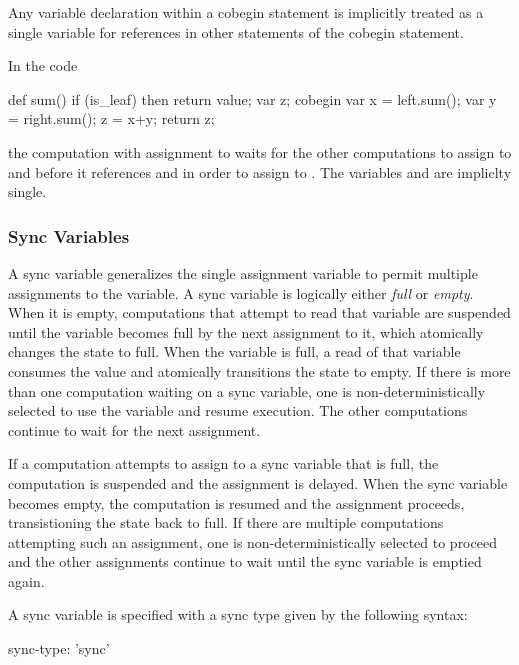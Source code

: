 Any variable declaration within a cobegin statement is implicitly
treated as a single variable for references in other statements of the
cobegin statement.
\begin{example}
In the code
\begin{chapel}
def sum() {
  if (is_leaf) then 
    return value;
  var z;
  cobegin {
    var x = left.sum();
    var y = right.sum();
    z = x+y;
  }
  return z;
}
\end{chapel}
the computation with assignment to  waits for the other
computations to assign to  and  before it
references  and  in order to assign to .  The
variables  and  are impliclty single.
\end{example}

\subsubsection{Sync Variables}
\label{Sync_Variables}

A sync variable generalizes the single assignment variable to permit
multiple assignments to the variable. A sync variable is logically
either {\em full} or {\em empty}. When it is empty, computations that
attempt to read that variable are suspended until the variable becomes
full by the next assignment to it, which atomically changes the state
to full. When the variable is full, a read of that variable consumes
the value and atomically transitions the state to empty. If there is
more than one computation waiting on a sync variable, one is
non-deterministically selected to use the variable and resume
execution.  The other computations continue to wait for the next
assignment.

If a computation attempts to assign to a sync variable that is full,
the computation is suspended and the assignment is delayed. When the
sync variable becomes empty, the computation is resumed and the
assignment proceeds, transistioning the state back to full. If there
are multiple computations attempting such an assignment, one is
non-deterministically selected to proceed and the other assignments
continue to wait until the sync variable is emptied again.

A sync variable is specified with a sync type given by the following
syntax:
\begin{syntax}
sync-type:
  'sync'
\end{syntax}

